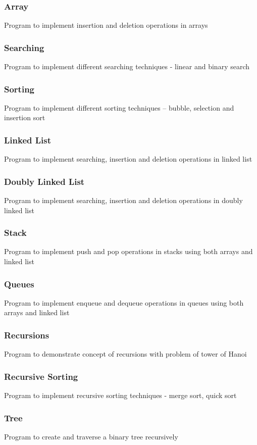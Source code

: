 \documentclass[twocolumn]{article}
\begin{document}
    \subsubsection*{Array}
    Program to implement insertion and deletion operations in arrays
    \subsubsection*{Searching}
    Program to implement different searching techniques - linear and binary search
    \subsubsection*{Sorting}
    Program to implement different sorting techniques – bubble, selection and insertion sort
    \subsubsection*{Linked List}
    Program to implement searching, insertion and deletion operations in linked list
    \subsubsection*{Doubly Linked List}
    Program to implement searching, insertion and deletion operations in doubly linked list
    \subsubsection*{Stack}
    Program to implement push and pop operations in stacks using both arrays and linked list
    \subsubsection*{Queues}
    Program to implement enqueue and dequeue operations in queues using both arrays and linked list
    \subsubsection*{Recursions}
    Program to demonstrate concept of recursions with problem of tower of Hanoi
    \subsubsection*{Recursive Sorting}
    Program to implement recursive sorting techniques - merge sort, quick sort
    \subsubsection*{Tree}
    Program to create and traverse a binary tree recursively
\end{document}
